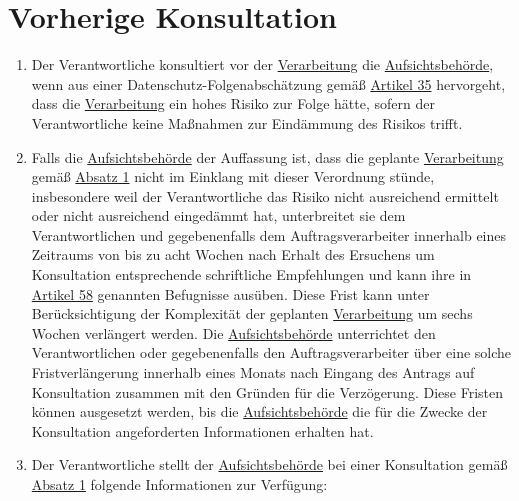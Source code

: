 \chapter{Vorherige Konsultation}
\label{ch:36}


\begin{enumerate}

  \item Der Verantwortliche konsultiert vor der \hyperref[itm:04-2]{Verarbeitung} die \hyperref[itm:04-21]{Aufsichtsbehörde}, wenn aus einer
   Datenschutz-Folgenabschätzung gemäß \hyperref[ch:35]{Artikel 35} hervorgeht, dass die \hyperref[itm:04-2]{Verarbeitung} ein hohes Risiko
   zur Folge hätte, sofern der Verantwortliche keine Maßnahmen zur Eindämmung des Risikos trifft.
  \label{itm:36-1}

  \item Falls die \hyperref[itm:04-21]{Aufsichtsbehörde} der Auffassung ist, dass die geplante \hyperref[itm:04-2]{Verarbeitung} gemäß \hyperref[itm:36-1]
   {Absatz 1} nicht im Einklang mit dieser Verordnung stünde, insbesondere weil der Verantwortliche das Risiko nicht
   ausreichend ermittelt oder nicht ausreichend eingedämmt hat, unterbreitet sie dem Verantwortlichen und
   gegebenenfalls dem Auftragsverarbeiter innerhalb eines Zeitraums von bis zu acht Wochen nach Erhalt des Ersuchens um
   Konsultation entsprechende schriftliche Empfehlungen und kann ihre in \hyperref[ch:58]{Artikel 58} genannten
   Befugnisse ausüben. Diese Frist kann unter Berücksichtigung der Komplexität der geplanten \hyperref[itm:04-2]{Verarbeitung} um sechs
   Wochen verlängert werden. Die \hyperref[itm:04-21]{Aufsichtsbehörde} unterrichtet den Verantwortlichen oder gegebenenfalls den
   Auftragsverarbeiter über eine solche Fristverlängerung innerhalb eines Monats nach Eingang des Antrags auf
   Konsultation zusammen mit den Gründen für die Verzögerung. Diese Fristen können ausgesetzt werden, bis die
   \hyperref[itm:04-21]{Aufsichtsbehörde} die für die Zwecke der Konsultation angeforderten Informationen erhalten hat.
  \label{itm:36-2}

  \item Der Verantwortliche stellt der \hyperref[itm:04-21]{Aufsichtsbehörde} bei einer Konsultation gemäß \hyperref[itm:36-1]{Absatz 1}
   folgende Informationen zur Verfügung:
  \label{itm:36-3}

  \begin{enumerate}
  

\end{enumerate}
\end{enumerate}
